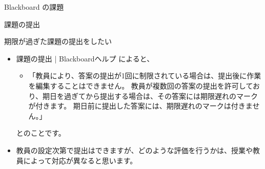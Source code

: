 \documentclass[a4j,10pt]{jsarticle}
\def\lthtmlcheckvsize{\ifdim\ht\sizebox<\vsize 
  \ifdim\wd\sizebox<\hsize\expandafter\hfill\fi \expandafter\vfill
  \else\expandafter\vss\fi}%
\begin{document}
{\begin{frame}[label={sec:org02882cd},fragile]{Blackboard の課題}
\begin{block}{課題の提出}
\begin{block}{期限が過ぎた課題の提出をしたい}
\begin{itemize}
\item 課題の提出 | Blackboardヘルプ によると、
\begin{itemize}
\item 「教員により、答案の提出が1回に制限されている場合は、提出後に作業を編集することはできません。
教員が複数回の答案の提出を許可しており、期日を過ぎてから提出する場合は、その答案には期限遅れのマークが付きます。
期日前に提出した答案には、期限遅れのマークは付きません。」
\end{itemize}
とのことです。
\item 教員の設定次第で提出はできますが、どのような評価を行うかは、授業や教員によって対応が異なると思います。
\end{itemize}
\end{block}
\end{block}
\end{frame}%
\lthtmlfigureZ
\lthtmlcheckvsize\clearpage}
\end{document}
